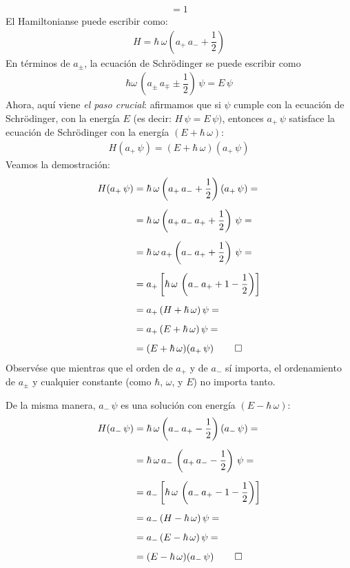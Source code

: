\begin{align}
[a_{-}, a_{+}] = 1
\label{eq:ecuacion_02_55}
\end{align}
El Hamiltonianse puede escribir como:
\begin{align}
H = \hbar \, \omega \left( a_{+} \, a_{-} +\dfrac{1}{2} \right)
\label{eq:ecuacion_02_056}
\end{align}
En términos de $a_{\pm}$, la ecuación de Schrödinger se puede escribir como
\begin{align}
\hbar \omega \, \left( a_{\pm} \, a_{\mp} \pm \dfrac{1}{2} \right) \, \psi = E \, \psi
\label{eq:ecuacion_02_057}
\end{align}
Ahora, aquí viene \emph{el paso crucial}: afirmamos que si $\psi$ cumple con la ecuación de Schrödinger, con la energía $E$ (es decir: $H \, \psi = E \, \psi)$, entonces $a_{+} \, \psi$ satisface la ecuación de Schrödinger con la energía $(E + \hbar \, \omega)$:
\begin{align*}
H (a_{+} \, \psi) = (E + \hbar \, \omega)(a_{+} \, \psi)
\end{align*}
Veamos la demostración:
\begin{align*}
H(a_{+} \, \psi) &= \hbar \, \omega \left( a_{+} \, a_{-} + \dfrac{1}{2} \right) (a_{+} \, \psi) = \\[0.5em]
&= \hbar \, \omega \left( a_{+} \, a_{-} \, a_{+} + \dfrac{1}{2} \right) \, \psi = \\[0.5em]
&= \hbar \, \omega \, a_{+} \left( a_{-} \, a_{+} + \dfrac{1}{2} \right) \, \psi = \\[0.5em]
&= a_{+} \left[ \hbar \, \omega \, \left( a_{-} \, a_{+} + 1 -  \dfrac{1}{2}  \right) \right] \\[0.5em]
&= a_{+} \, (H + \hbar \, \omega) \, \psi = \\[0.5em]
&= a_{+} \, (E + \hbar \, \omega) \, \psi =\\[0.5em]
&= (E + \hbar \, \omega)(a_{+} \, \psi) \, \qed
\end{align*}
Observése que mientras que el orden de $a_{+}$ y de $a_{-}$ sí importa, el ordenamiento de $a_{\pm}$ y cualquier constante (como $\hbar$, $\omega$, y $E$) no importa tanto.
\par
De la misma manera, $a_{-} \, \psi$ es una solución con energía $(E - \hbar \, \omega)$:
\begin{align*}
H(a_{-} \, \psi) &= \hbar \, \omega \left( a_{-} \, a_{+} - \dfrac{1}{2} \right) (a_{-} \, \psi) = \\[0.5em]
&= \hbar \, \omega \, a_{-} \, \left( a_{+} \, a_{-} - \dfrac{1}{2} \right) \, \psi = \\[0.5em]
&= a_{-} \left[ \hbar \, \omega \, \left( a_{-} \, a_{+} - 1 -  \dfrac{1}{2}  \right) \right] \\[0.5em]
&= a_{-} \, (H - \hbar \, \omega) \, \psi = \\[0.5em]
&= a_{-} \, (E - \hbar \, \omega) \, \psi =\\[0.5em]
&= (E - \hbar \, \omega)(a_{-} \, \psi) \, \qed
\end{align*}
